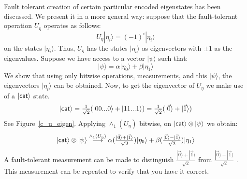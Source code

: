 \documentclass[twocolumn,11pt]{article}
\begin{document}
Fault tolerant creation of certain particular encoded eigenstates has been
discussed\cite{shorFT,KLZ}.
We present it in a more general way:
suppose that the fault-tolerant operation $U_\eta$ operates as follows:
\begin{equation}
U_\eta|\eta_i\rangle=(-1)^{i}|\eta_i\rangle
\end{equation}
on the states $|\eta_i\rangle$.
Thus, $U_\eta$ has the states $|\eta_i \rangle$ as 
eigenvectors with $\pm1$ as the eigenvalues.
Suppose we have access to a vector $|\psi\rangle$ such that:
\begin{equation}
|\psi\rangle=\alpha|\eta_0\rangle+\beta|\eta_1\rangle
\end{equation}
We show that using only bitwise operations, measurements, 
and this $|\psi\rangle$, the eigenvectors $|\eta_i\rangle$ can be obtained.
Now, to get the eigenvector of $U_\eta$ we make use of a $|\mbox{\sf
cat}\rangle$ state.
\begin{equation}
\mbox{$ |\mbox{\sf cat}\rangle=\frac{1}{\sqrt{2}}
(|00...0\rangle+|11...1\rangle)=\frac{1}{\sqrt{2}}(|\vec{0}\rangle+
|\vec{1}\rangle) $}
\end{equation}
See Figure~\ref{c_u_eigen}.
Applying $\wedge_1(U_\eta)$ bitwise, on $|\mbox{\sf
cat}\rangle\otimes|\psi\rangle$ we
obtain:
\begin{equation}
\mbox{$ |\mbox{\sf cat}\rangle\otimes|\psi\rangle\overset{\wedge_1(U_\eta)}
{\longrightarrow}\alpha(\frac{|\vec{0}\rangle+|\vec{1}\rangle}
{\sqrt{2}})|\eta_0\rangle+\beta(\frac{|\vec{0}\rangle-|\vec{1}\rangle}
{\sqrt{2}})|\eta_1\rangle $}
\end{equation}
A fault-tolerant measurement can be made to distinguish 
$\frac{|\vec{0}\rangle+|\vec{1}\rangle}{\sqrt{2}}$ 
from $\frac{|\vec{0}\rangle-|\vec{1}\rangle}{\sqrt{2}}$ \cite{shorFT}.
This measurement can be repeated to verify that you have it correct.
\end{document}
